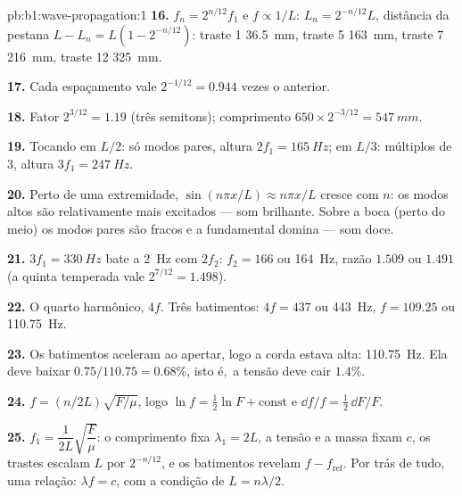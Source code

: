 \begin{solution}{pb:b1:wave-propagation:1}
\textbf{16.} $f_n = 2^{n/12}f_1$ e $f \propto 1/L$: $L_n = 2^{-n/12}L$,
distância da pestana $L - L_n = L(1 - 2^{-n/12})$: traste 1 \qty{36.5}{mm},
traste 5 \qty{163}{mm}, traste 7 \qty{216}{mm}, traste 12 \qty{325}{mm}.

\textbf{17.} Cada espaçamento vale $2^{-1/12} = 0.944$ vezes o anterior.

\textbf{18.} Fator $2^{3/12} = 1.19$ (três semitons); comprimento
$650 \times 2^{-3/12} = \qty{547}{mm}$.

\textbf{19.} Tocando em $L/2$: só modos pares, altura $2f_1 =
\qty{165}{Hz}$; em $L/3$: múltiplos de $3$, altura $3f_1 = \qty{247}{Hz}$.

\textbf{20.} Perto de uma extremidade, $\sin(n\pi x/L) \approx n\pi x/L$ cresce com
$n$: os modos altos são relativamente mais excitados --- som brilhante. Sobre a
boca (perto do meio) os modos pares são fracos e a fundamental domina
--- som doce.

\textbf{21.} $3f_1 = \qty{330}{Hz}$ bate a \qty{2}{Hz} com $2f_2$:
$f_2 = 166$ ou \qty{164}{Hz}, razão $1.509$ ou $1.491$ (a quinta
temperada vale $2^{7/12} = 1.498$).

\textbf{22.} O quarto harmônico, $4f$. Três batimentos: $4f = 437$ ou
\qty{443}{Hz}, $f = 109.25$ ou \qty{110.75}{Hz}.

\textbf{23.} Os batimentos aceleram ao apertar, logo a corda estava alta:
\qty{110.75}{Hz}. Ela deve baixar $0.75/110.75 = 0.68\%$, isto é,\ a
tensão deve cair $1.4\%$.

\textbf{24.} $f = (n/2L)\sqrt{F/\mu}$, logo $\ln f = \tfrac12\ln F + \text{const}$
e $\dd f/f = \tfrac12\,\dd F/F$.

\textbf{25.} $f_1 = \dfrac{1}{2L}\sqrt{\dfrac{F}{\mu}}$: o comprimento fixa
$\lambda_1 = 2L$, a tensão e a massa fixam $c$, os trastes escalam $L$ por
$2^{-n/12}$, e os batimentos revelam $f - f_{\text{ref}}$. Por trás de tudo, uma
relação: $\lambda f = c$, com a condição de  $L = n\lambda/2$.
\end{solution}
